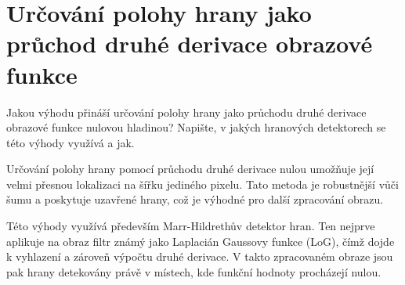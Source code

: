 \section{Určování polohy hrany jako průchod druhé derivace obrazové funkce}
Jakou výhodu přináší určování polohy hrany jako průchodu druhé derivace obrazové funkce nulovou hladinou? 
Napište, v jakých hranových detektorech se této výhody využívá a jak.

Určování polohy hrany pomocí průchodu druhé derivace nulou umožňuje její velmi přesnou lokalizaci na šířku jediného 
pixelu. Tato metoda je robustnější vůči šumu a poskytuje uzavřené hrany, což je výhodné pro další zpracování obrazu.

Této výhody využívá především Marr-Hildrethův detektor hran. Ten nejprve aplikuje na obraz filtr známý jako Laplacián 
Gaussovy funkce (LoG), čímž dojde k vyhlazení a zároveň výpočtu druhé derivace. V takto zpracovaném obraze jsou pak 
hrany detekovány právě v místech, kde funkční hodnoty procházejí nulou.